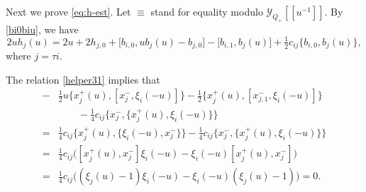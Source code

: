 \documentclass[11pt,reqno]{amsart}
\numberwithin{equation}{section}
\theoremstyle{definition}
\theoremstyle{remark}
\newcommand{\beq}{\begin{equation}}
\newcommand{\eeq}{\end{equation}}
\newcommand{\Y}{{\mathscr{Y}}}
\begin{document}
\subsubsection{}\label{ssec:h-est} Next we prove \eqref{eq:h-est}. Let $\equiv$ stand for equality modulo $\Y_{Q_+}[\![u^{-1}]\!]$. By \eqref{bi0biu}, we have
\beq\label{todo1}
2u h_j(u)
=
2u+2h_{j,0}
+\bigl[b_{i,0},u b_j(u)-b_{j,0}\bigr]
-\bigl[b_{i,1},b_j(u)\bigr]
+\tfrac{1}{2}c_{ij}\bigl\{b_{i,0},b_j(u)\bigr\},
\eeq
where $j=\tau i$.

The relation \eqref{helper31} implies that
\begin{align*}
-&\tfrac{1}{2}u
 \bigl\{
 x_j^+(u),
 [x_j^-,\xi_i(-u)]
 \bigr\}
-\tfrac{1}{2}
 \bigl\{
 x_j^+(u),
 [x_{j,1}^-,\xi_i(-u)]
 \bigr\}
\\
&\qquad
-\tfrac{1}{4}c_{ij}
 \bigl\{
 x_j^-,
 \{x_j^+(u),\xi_i(-u)\}
 \bigr\}
\\
={}&
\tfrac{1}{4}c_{ij}
 \bigl\{
 x_j^+(u),
 \{\xi_i(-u),x_j^-\}
 \bigr\}
-\tfrac{1}{4}c_{ij}
 \bigl\{
 x_j^-,
 \{x_j^+(u),\xi_i(-u)\}
 \bigr\}\\
={}&
\tfrac{1}{4}c_{ij}
\bigl(
 [x_j^+(u),x_j^-]\xi_i(-u)
-\xi_i(-u)[x_j^+(u),x_j^-]
\bigr)\\
={}&\tfrac{1}{4}c_{ij}
\bigl(
 (\xi_j(u)-1)\xi_i(-u)
-\xi_i(-u)(\xi_j(u)-1)
\bigr)=0.
\end{align*}
\end{document}
